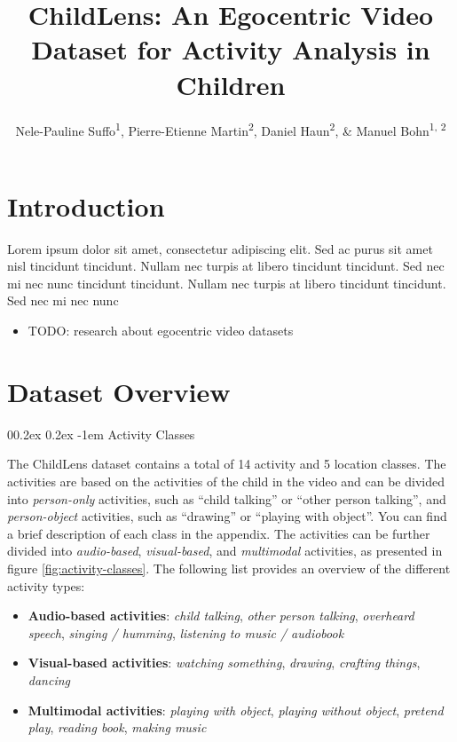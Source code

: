 \documentclass[
  man,floatsintext]{apa6}
\title{ChildLens: An Egocentric Video Dataset for Activity Analysis in Children}
\author{Nele-Pauline Suffo\textsuperscript{1}, Pierre-Etienne Martin\textsuperscript{2}, Daniel Haun\textsuperscript{2}, \& Manuel Bohn\textsuperscript{1, 2}}
\date{}
\affiliation{\vspace{0.5cm}\textsuperscript{1} Institute of Psychology in Education, Leuphana University Lüneburg\\\textsuperscript{2} Max Planck Institute for Evolutionary Anthropology}
\makeatletter
\providecommand{\tightlist}{%
  \setlength{\itemsep}{0pt}\setlength{\parskip}{0pt}}
\let\oldparagraph\paragraph
\renewcommand{\paragraph}{
    \@ifstar
      \xxxParagraphStar
      \xxxParagraphNoStar
  }
\newcommand{\xxxParagraphStar}[1]{\oldparagraph*{#1}\mbox{}}
\newcommand{\xxxParagraphNoStar}[1]{\oldparagraph{#1}\mbox{}}
\renewcommand{\paragraph}{\@startsection{paragraph}{4}{\parindent}%
  {0\baselineskip \@plus 0.2ex \@minus 0.2ex}%
  {-1em}%
  {\normalfont\normalsize\bfseries\itshape\typesectitle}}
\makeatother
\begin{document}
\maketitle

\section{Introduction}\label{introduction}

Lorem ipsum dolor sit amet, consectetur adipiscing elit. Sed ac purus sit amet nisl tincidunt tincidunt. Nullam nec turpis at libero tincidunt tincidunt. Sed nec mi nec nunc tincidunt tincidunt. Nullam nec turpis at libero tincidunt tincidunt. Sed nec mi nec nunc

\begin{itemize}
\tightlist
\item
  TODO: research about egocentric video datasets
\end{itemize}

\section{Dataset Overview}\label{dataset-overview}

\paragraph{Activity Classes}\label{activity-classes}

The ChildLens dataset contains a total of 14 activity and 5 location classes. The activities are based on the activities of the child in the video and can be divided into \emph{person-only} activities, such as ``child talking'' or ``other person talking'', and \emph{person-object} activities, such as ``drawing'' or ``playing with object''. You can find a brief description of each class in the appendix. The activities can be further divided into \emph{audio-based}, \emph{visual-based}, and \emph{multimodal} activities, as presented in figure \ref{fig:activity-classes}. The following list provides an overview of the different activity types:

\begin{itemize}
\tightlist
\item
  \textbf{Audio-based activities}: \emph{child talking}, \emph{other person talking}, \emph{overheard speech}, \emph{singing / humming}, \emph{listening to music / audiobook}
\item
  \textbf{Visual-based activities}: \emph{watching something}, \emph{drawing}, \emph{crafting things}, \emph{dancing}
\item
  \textbf{Multimodal activities}: \emph{playing with object}, \emph{playing without object}, \emph{pretend play}, \emph{reading book}, \emph{making music}
\end{itemize}
\end{document}
